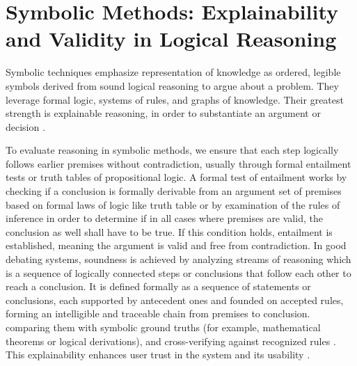 \documentclass[conference]{IEEEtran}
\begin{document}
\section{Symbolic Methods: Explainability and Validity in Logical Reasoning}
Symbolic techniques emphasize representation of knowledge as ordered, legible symbols derived from sound logical reasoning to argue about a problem. They leverage formal logic, systems of rules, and graphs of knowledge. Their greatest strength is explainable reasoning, in order to substantiate an argument or decision \cite{kasif2024trilogy}. 

To evaluate reasoning in symbolic methods, we ensure that each step logically follows earlier premises without contradiction, usually through formal entailment tests or truth tables of propositional logic. A formal test of entailment works by checking if a conclusion is formally derivable from an argument set of premises based on formal laws of logic like truth table or by examination of the rules of inference in order to determine if in all cases where premises are valid, the conclusion as well shall have to be true. If this condition holds, entailment is established, meaning the argument is valid and free from contradiction. In good debating systems, soundness is achieved by analyzing streams of reasoning which is a sequence of logically connected steps or conclusions that follow each other to reach a conclusion. It is defined formally as a sequence of statements or conclusions, each supported by antecedent ones and founded on accepted rules, forming an intelligible and traceable chain from premises to conclusion. comparing them with symbolic ground truths (for example, mathematical theorems or logical derivations), and cross-verifying against recognized rules \cite{lee2025reasoning}. This explainability enhances user trust in the system and its usability \cite{kasif2024trilogy}.
\end{document}
